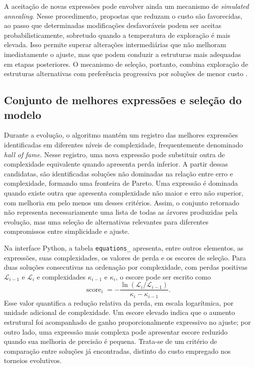 A aceitação de novas expressões pode envolver ainda um mecanismo de \textit{simulated annealing}. Nesse procedimento, propostas que reduzam o custo são favorecidas, ao passo que determinadas modificações desfavoráveis podem ser aceitas probabilisticamente, sobretudo quando a temperatura de exploração é mais elevada. Isso permite superar alterações intermediárias que não melhoram imediatamente o ajuste, mas que podem conduzir a estruturas mais adequadas em etapas posteriores.  O mecanismo de seleção, portanto, combina exploração de estruturas alternativas com preferência progressiva por soluções de menor custo \cite{cranmer2023pysr}.

\subsection{Conjunto de melhores expressões e seleção do modelo}
\label{subsec:sr_hall_of_fame}

Durante a evolução, o algoritmo mantém um registro das melhores expressões identificadas em diferentes níveis de complexidade, frequentemente denominado \textit{hall of fame}. Nesse registro, uma nova expressão pode substituir outra de complexidade equivalente quando apresenta perda inferior. A partir dessas candidatas, são identificadas soluções não dominadas na relação entre erro e complexidade, formando uma fronteira de Pareto. Uma expressão é dominada quando existe outra que apresenta complexidade não maior e erro não superior, com melhoria em pelo menos um desses critérios. Assim, o conjunto retornado não representa necessariamente uma lista de todas as árvores produzidas pela evolução, mas uma seleção de alternativas relevantes para diferentes compromissos entre simplicidade e ajuste.

Na interface Python, a tabela \texttt{equations\_} apresenta, entre outros elementos, as expressões, suas complexidades, os valores de perda e os escores de seleção. Para duas soluções consecutivas na ordenação por complexidade, com perdas positivas $\mathcal L_{i-1}$ e $\mathcal L_i$ e complexidades $\kappa_{i-1}$ e $\kappa_i$, o escore pode ser escrito como
\begin{equation}
\label{eq:sr_score}
\operatorname{score}_i=
-\frac{\ln(\mathcal L_i/\mathcal L_{i-1})}
{\kappa_i-\kappa_{i-1}}.
\end{equation}
Esse valor quantifica a redução relativa da perda, em escala logarítmica, por unidade adicional de complexidade. Um escore elevado indica que o aumento estrutural foi acompanhado de ganho proporcionalmente expressivo no ajuste; por outro lado, uma expressão mais complexa pode apresentar escore reduzido quando sua melhoria de precisão é pequena. Trata-se de um critério de comparação entre soluções já encontradas, distinto do custo empregado nos torneios evolutivos.

